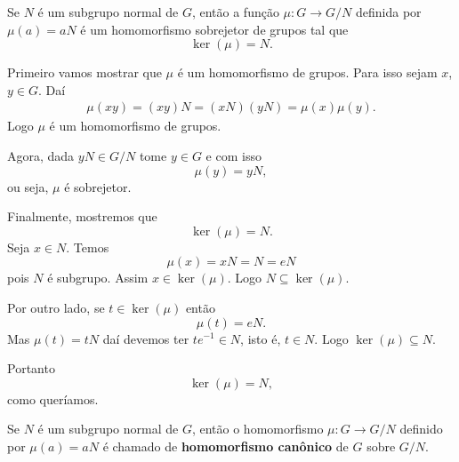 \begin{proposicao}
    Se $N$ é um subgrupo normal de $G$, então a função $\mu : G \to G/N$ definida por $\mu(a) = aN$ é um homomorfismo sobrejetor de grupos tal que
    \[
        \ker(\mu) = N.
    \]
\end{proposicao}
\begin{prova}
    Primeiro vamos mostrar que $\mu$ é um homomorfismo de grupos. Para isso sejam $x$, $y \in G$. Daí
    \begin{align*}
        \mu(xy) = (xy)N = (xN)(yN) = \mu(x)\mu(y).
    \end{align*}
    Logo $\mu$ é um homomorfismo de grupos.

    Agora, dada $yN \in G/N$ tome $y \in G$ e com isso
    \[
        \mu(y) = yN,
    \]
    ou seja, $\mu$ é sobrejetor.

    Finalmente, mostremos que
    \[
        \ker(\mu) = N.
    \]
    Seja $x \in N$. Temos
    \[
        \mu(x) = xN = N = eN
    \]
    pois $N$ é subgrupo. Assim $x \in \ker(\mu)$. Logo $N \subseteq \ker(\mu)$.

    Por outro lado, se $t \in \ker(\mu)$ então
    \[
        \mu(t) = eN.
    \]
    Mas $\mu(t) = tN$ daí devemos ter $te^{-1} \in N$, isto é, $t \in N$. Logo $\ker(\mu) \subseteq N$.

    Portanto
    \[
        \ker(\mu) = N,
    \]
    como queríamos.
\end{prova}

\begin{definicao}
    Se $N$ é um subgrupo normal de $G$, então o homomorfismo $\mu : G \to G/N$ definido por $\mu(a) = aN$ é chamado de \textbf{homomorfismo canônico} de $G$ sobre $G/N$.
\end{definicao}

